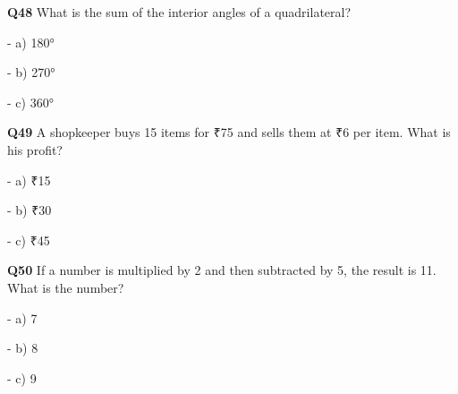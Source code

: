 \textbf{Q48} What is the sum of the interior angles of a quadrilateral?\par
\quad - a) 180°\par
\quad - b) 270°\par
\quad - c) 360°\par

\textbf{Q49} A shopkeeper buys 15 items for ₹75 and sells them at ₹6 per item. What is his profit?\par
\quad - a) ₹15\par
\quad - b) ₹30\par
\quad - c) ₹45\par

\textbf{Q50} If a number is multiplied by 2 and then subtracted by 5, the result is 11. What is the number?\par
\quad - a) 7\par
\quad - b) 8\par
\quad - c) 9\par